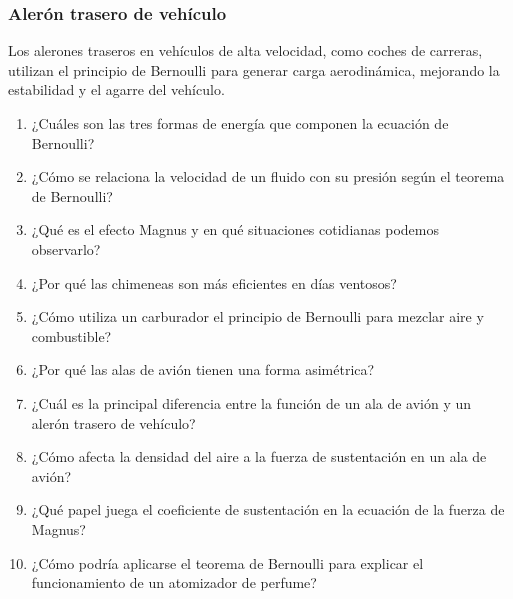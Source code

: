 \documentclass[../main]{subfiles}
\begin{document}
\subsubsection{Alerón trasero de vehículo}

Los alerones traseros en vehículos de alta velocidad, como coches de carreras, utilizan el principio de Bernoulli para generar carga aerodinámica, mejorando la estabilidad y el agarre del vehículo.


\begin{enumerate}
\item ¿Cuáles son las tres formas de energía que componen la ecuación de Bernoulli?
\item ¿Cómo se relaciona la velocidad de un fluido con su presión según el teorema de Bernoulli?
\item ¿Qué es el efecto Magnus y en qué situaciones cotidianas podemos observarlo?
\item ¿Por qué las chimeneas son más eficientes en días ventosos?
\item ¿Cómo utiliza un carburador el principio de Bernoulli para mezclar aire y combustible?
\item ¿Por qué las alas de avión tienen una forma asimétrica?
\item ¿Cuál es la principal diferencia entre la función de un ala de avión y un alerón trasero de vehículo?
\item ¿Cómo afecta la densidad del aire a la fuerza de sustentación en un ala de avión?
\item ¿Qué papel juega el coeficiente de sustentación en la ecuación de la fuerza de Magnus?
\item ¿Cómo podría aplicarse el teorema de Bernoulli para explicar el funcionamiento de un atomizador de perfume?
\end{enumerate}
\end{document}
